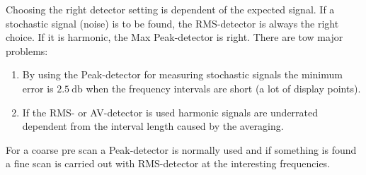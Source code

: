 Choosing the \glqq right\grqq{ } detector setting is dependent of the expected signal. If a stochastic signal (noise) is to be found, the \ac{RMS}-detector is always the right choice. If it is harmonic, the Max Peak-detector is right. There are tow major problems:

\begin{enumerate}
\item By using the Peak-detector for measuring stochastic signals the minimum error is $\SI{2.5}{\decibel}$ when the frequency intervals are short (a lot of display points).
\item If the \ac{RMS}- or AV-detector is used harmonic signals are underrated dependent from the interval length caused by the averaging.
\end{enumerate} 

For a coarse pre scan a Peak-detector is normally used and if something is found a fine scan is carried out with \ac{RMS}-detector at the interesting frequencies.



